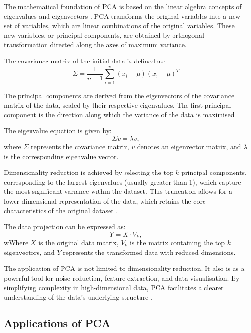 \documentclass[conference]{IEEEtran}
\begin{document}
The mathematical foundation of PCA is based on the linear algebra concepts of eigenvalues and eigenvectors \cite{wold1987principal}. PCA transforms the original variables into a new set of variables, which are linear combinations of the original variables. These new variables, or principal components, are obtained by orthogonal transformation directed along the axes of maximum variance.

The covariance matrix of the initial data is defined as:
\[
\Sigma = \frac{1}{n-1} \sum_{i=1}^{n} (x_i - \mu)(x_i - \mu)^T
\]


The principal components are derived from the eigenvectors of the covariance matrix of the data, scaled by their respective eigenvalues. The first principal component is the direction along which the variance of the data is maximised.

The eigenvalue equation is given by:
\[
\Sigma v = \lambda v,
\]
where $\Sigma$ represents the covariance matrix, $v$ denotes an eigenvector matrix, and $\lambda$ is the corresponding eigenvalue vector.


Dimensionality reduction is achieved by selecting the top $k$ principal components, corresponding to the largest eigenvalues (usually greater than 1), which capture the most significant variance within the dataset. This truncation allows for a lower-dimensional representation of the data, which retains the core characteristics of the original dataset \cite{shlens2014tutorial}.

The data projection can be expressed as:
\[
Y = X \cdot V_k,
\]
wWhere $X$ is the original data matrix, $V_k$ is the matrix containing the top $k$ eigenvectors, and $Y$ represents the transformed data with reduced dimensions.

The application of PCA is not limited to dimensionality reduction. It also is as a powerful tool for noise reduction, feature extraction, and data visualisation. By simplifying complexity in high-dimensional data, PCA facilitates a clearer understanding of the data's underlying structure \cite{ivosev2008dimensionality}.

\subsection{Applications of PCA}
\end{document}
